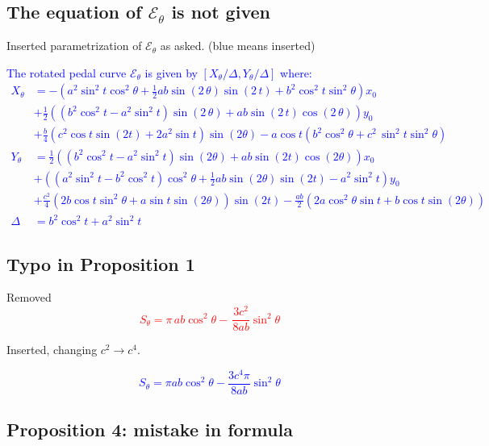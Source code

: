 \subsection{The equation of $\mathcal{E}_\theta$ is not given}

Inserted parametrization of $\mathcal{E}_{\theta}$ as asked. (blue means inserted)

\textcolor{blue} { 
The rotated pedal curve $\mathcal{E}_{\theta}$ is given by
$[X_\theta/\Delta,Y_\theta/\Delta]$ where:
{\small 
\begin{align*}
 X_\theta &=  - 
  \left(     {a}^{2}  \sin^2  t   
\cos^2\theta +\frac{1}{2} a b\sin \left( 2\,\theta
 \right)  \sin \left( 2\,t \right) +  b^2  \cos^2 t 
  \sin^2\theta  
 \right) {x_0} \\
&+ \frac{1}{2} \left(  (b^2
  \cos^2 t   - {a}^{2} \sin^2t)\sin \left( 2\,\theta \right)
  +ab\sin
 \left( 2\,t \right) \cos \left( 2\,\theta \right)   \right)  y_0
 \\
 &+ \frac{b}{4}(c^2 \cos t \sin(2t) + 2 a^2 \sin{ t} )\sin(2\theta) - a \cos t (b^2\cos^2\theta + c^2\, \sin^2 t\sin^2\theta) 
 \\
 Y_\theta&= \frac{1}{2} \left( (  b^2  \cos^2t -   a^2\sin ^2{t} )  \sin(2\theta)+ a b  \sin (2t)  \cos(2  \theta)       \right)  x_0\\
 &+ \left(  (    a^2 \sin ^2{t}-b^2\cos^2t) \cos^2\theta   +\frac{1}{2} a b  \sin(2\theta)     \sin(2 t)  - a^2  \sin ^2{t}\right)  y_0\\
 &+  \frac{c^2}{4}  \left(2b \cos t\sin^2\theta+ a  \sin {t}   \sin(2\theta)    \right)  \sin(2 t) 
  -\frac{ab}{2}\left(2a \cos^2\theta  \sin {t}   +b \cos{t}  \sin(2\theta)  \right)
   \\
 \Delta&={b}^{2}   \cos^2 t +{a}^{2}\sin^2t
\end{align*}
}
}

\subsection{Typo in Proposition 1}

Removed 
 \textcolor{red} {
 \[ S_{\theta}=\pi\,ab   \cos^2   \theta  -  \,{\frac {3
		    c^{2} }{8ab}}\sin^2  \theta   
\]
}
 
Inserted, changing $c^2 \rightarrow c^4$.

\textcolor{blue}{ 
\[S_{\theta}=\pi a b \cos^2\theta -\frac{  3 c^4\pi}{8 ab} \sin^2\theta\]
}

\subsection{Proposition 4: mistake in formula}

